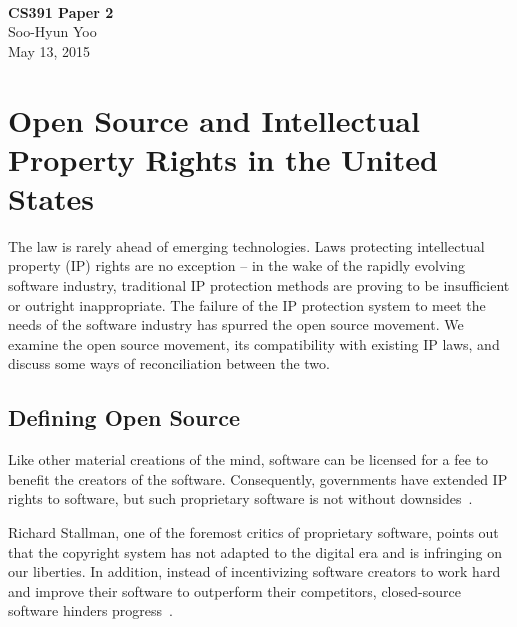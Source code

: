 \documentclass[12pt,letterpaper]{article}
\begin{document}
\fancyfoot{}
\begin{center}
    \hfill \\
    \vspace{4in}
    {\bf\Huge CS391 Paper 2 \\}
    \vspace{2in}
    {\Large Soo-Hyun Yoo \\ May 13, 2015}
\end{center}

\newpage
{}

\section*{Open Source and Intellectual Property Rights in the United States}


The law is rarely ahead of emerging technologies. Laws protecting intellectual
property (IP) rights are no exception -- in the wake of the rapidly evolving
software industry, traditional IP protection methods are proving to be
insufficient or outright inappropriate. The failure of the IP protection system
to meet the needs of the software industry has spurred the open source
movement. We examine the open source movement, its compatibility with existing
IP laws, and discuss some ways of reconciliation between the two.

\subsection*{Defining Open Source}


Like other material creations of the mind, software can be licensed for a fee
to benefit the creators of the software. Consequently, governments have
extended IP rights to software, but such proprietary software is not without
downsides~\citep[p. 200]{quinn2015}.

Richard Stallman, one of the foremost critics of proprietary software, points
out that the copyright system has not adapted to the digital era and is
infringing on our liberties. In addition, instead of incentivizing software
creators to work hard and improve their software to outperform their
competitors, closed-source software hinders progress~\citep[p. 201]{quinn2015}.
\end{document}
